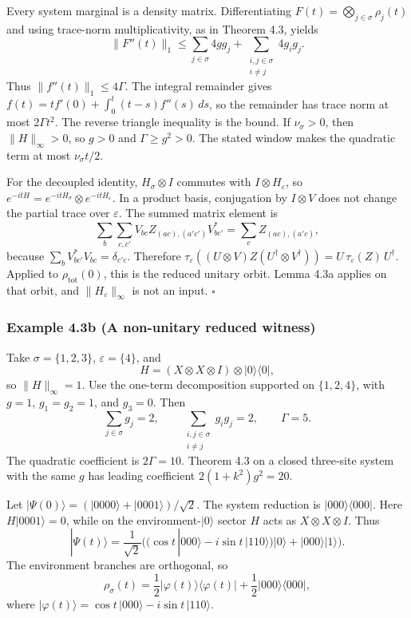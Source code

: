 \documentclass[
  11pt,
]{article}
\begin{document}
Every system marginal is a density matrix. Differentiating
\(F(t)=\bigotimes_{j\in\sigma}\rho_j(t)\) and using trace-norm
multiplicativity, as in Theorem 4.3, yields
\[
\|F''(t)\|_1
\le\sum_{j\in\sigma}4gg_j+\sum_{\substack{i,j\in\sigma\\ i\ne j}}4g_ig_j.
\]
Thus \(\|f''(t)\|_1\le 4\Gamma\). The integral remainder gives
\(f(t)=tf'(0)+\int_0^t(t-s)f''(s)\,ds\), so the remainder has trace
norm at most \(2\Gamma t^2\). The reverse triangle inequality is the
bound. If \(\nu_\sigma>0\), then \(\|H\|_\infty>0\), so \(g>0\) and
\(\Gamma\ge g^2>0\). The stated window makes the quadratic term at most
\(\nu_\sigma t/2\).

For the decoupled identity, \(H_\sigma\otimes I\) commutes with
\(I\otimes H_\varepsilon\), so
\(e^{-itH}=e^{-itH_\sigma}\otimes e^{-itH_\varepsilon}\).
In a product basis, conjugation by \(I\otimes V\) does not change the
partial trace over \(\varepsilon\). The summed matrix element is
\[
\sum_b\sum_{c,c'}V_{bc}Z_{(ac),(a'c')}V^*_{bc'}
=\sum_c Z_{(ac),(a'c)},
\]
because \(\sum_b V^*_{bc'}V_{bc}=\delta_{c'c}\). Therefore
\(\tau_\varepsilon((U\otimes V)Z(U^\dagger\otimes V^\dagger))
=U\,\tau_\varepsilon(Z)\,U^\dagger\).
Applied to \(\rho_{\mathrm{tot}}(0)\), this is the reduced unitary
orbit. Lemma 4.3a applies on that orbit, and \(\|H_\varepsilon\|_\infty\)
is not an input. \(\square\)

\subsubsection{Example 4.3b (A non-unitary reduced witness)}\label{example-4.3b-a-non-unitary-reduced-witness}

Take \(\sigma=\{1,2,3\}\), \(\varepsilon=\{4\}\), and
\[
H=(X\otimes X\otimes I)\otimes|0\rangle\langle0|,
\]
so \(\|H\|_\infty=1\). Use the one-term decomposition supported on
\(\{1,2,4\}\), with \(g=1\), \(g_1=g_2=1\), and \(g_3=0\). Then
\[
\sum_{j\in\sigma}g_j=2,\qquad
\sum_{\substack{i,j\in\sigma\\ i\ne j}}g_ig_j=2,\qquad
\Gamma=5.
\]
The quadratic coefficient is \(2\Gamma=10\). Theorem 4.3 on a closed
three-site system with the same \(g\) has leading coefficient
\(2(1+k^2)g^2=20\).

Let \(|\Psi(0)\rangle=(|0000\rangle+|0001\rangle)/\sqrt{2}\). The system
reduction is \(|000\rangle\langle000|\). Here \(H|0001\rangle=0\), while
on the environment-\(|0\rangle\) sector \(H\) acts as
\(X\otimes X\otimes I\). Thus
\[
|\Psi(t)\rangle
=\frac1{\sqrt2}
\Big(\big(\cos t\,|000\rangle-i\sin t\,|110\rangle\big)|0\rangle
+|000\rangle|1\rangle\Big).
\]
The environment branches are orthogonal, so
\[
\rho_\sigma(t)
=\frac12|\varphi(t)\rangle\langle\varphi(t)|
+\frac12|000\rangle\langle000|,
\]
where \(|\varphi(t)\rangle=\cos t\,|000\rangle-i\sin t\,|110\rangle\).
\end{document}
